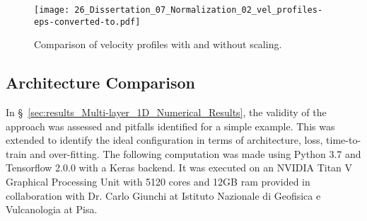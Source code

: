 

\clearpage
\begin{figure}[ht!]
    \centering
    \texttt{[image: 26\_Dissertation\_07\_Normalization\_02\_vel\_profiles-eps-converted-to.pdf]}
    \caption[Comparison of velocity profiles with and without scaling.]{Comparison of velocity profiles with and without scaling.}
    \label{fig:scaling_velocity}
\end{figure}

\subsection{Architecture Comparison}\label{sec:results_Architecture_Comparison}
In §~\ref{sec:results_Multi-layer_1D_Numerical_Results}, the validity of the approach was assessed and pitfalls identified for a simple example. This was extended to identify the ideal configuration in terms of architecture, loss, time-to-train and over-fitting. The following computation was made using Python 3.7 and Tensorflow 2.0.0 with a Keras backend. It was executed on an NVIDIA Titan V Graphical Processing Unit with 5120 cores and 12GB ram provided in collaboration with Dr. Carlo Giunchi at Istituto Nazionale di Geofisica e Vulcanologia at Pisa.

